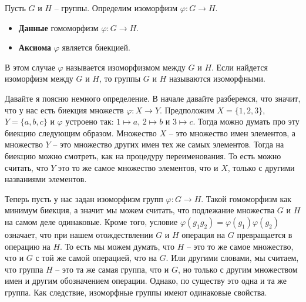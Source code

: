 \begin{definition}
\label{def::IsomorphismGr}
Пусть $G$ и $H$ -- группы.
Определим изоморфизм $\varphi \colon G\to H$.
\begin{itemize}
\item \textbf{Данные} гомоморфизм $\varphi \colon G\to H$.

\item \textbf{Аксиома} $\varphi$ является биекцией.
\end{itemize}
В этом случае $\varphi$ называется изоморфизмом между $G$ и $H$.
Если найдется изоморфизм между $G$ и $H$, то группы $G$ и $H$ называются изоморфными.
\end{definition}

Давайте я поясню немного определение.
В начале давайте разберемся, что значит, что у нас есть биекция множеств $\varphi \colon X\to Y$.
Предположим $X = \{1, 2, 3\}$, $Y = \{a, b, c\}$ и $\varphi$ устроено так: $1 \mapsto a$, $2\mapsto b$ и $3\mapsto c$.
Тогда можно думать про эту биекцию следующим образом.
Множество $X$ -- это множество имен элементов, а множество $Y$ -- это множество других имен тех же самых элементов.
Тогда на биекцию можно смотреть, как на процедуру переименования.
То есть можно считать, что $Y$ это то же самое множество элементов, что и $X$, только с другими названиями элементов.

Теперь пусть у нас задан изоморфизм групп $\varphi\colon G\to H$.
Такой гомоморфизм как минимум биекция, а значит мы можем считать, что подлежание множества $G$ и $H$ на самом деле одинаковые.
Кроме того, условие $\varphi(g_1g_2) = \varphi(g_1) \varphi(g_2)$ означает, что при нашем отождествлении $G$ и $H$ операция на $G$ превращается в операцию на $H$.
То есть мы можем думать, что $H$ -- это то же самое множество, что и $G$ с той же самой операцией, что на $G$.
Или другими словами, мы считаем, что группа $H$ -- это та же самая группа, что и $G$, но только с другим множеством имен и другим обозначением операции.
Однако, по существу это одна и та же группа.
Как следствие, изоморфные группы имеют одинаковые свойства.

